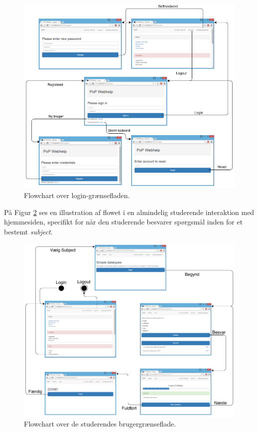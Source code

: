 \documentclass[11pt, a4paper]{article}
\begin{document}
\begin{figure}[htpb]
    \centering
    \includegraphics[width=1\linewidth]{figures/interface/flow_login.png}
    \caption{Flowchart over login-grænsefladen.}
    \label{fig:flow_chart_login}
\end{figure}
\FloatBarrier

På Figur \ref{fig:flow_chart_student} ses en illustration af flowet i en almindelig studerende interaktion med hjemmesiden, specifikt for når den studerende besvarer spørgsmål inden for et bestemt \emph{subject}.

\begin{figure}[htpb]
    \centering
    \includegraphics[width=1\linewidth]{figures/interface/flow_student.png}
    \caption{Flowchart over de studerendes brugergrænseflade.}
    \label{fig:flow_chart_student}
\end{figure}
\FloatBarrier
\end{document}
